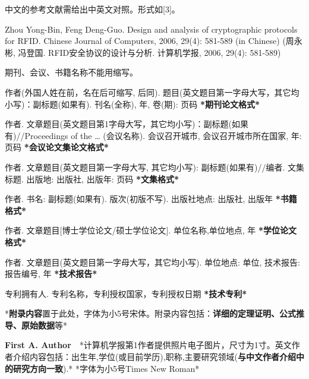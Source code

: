 \documentclass[10.5pt,compsoc]{CjC}
\theoremstyle{mystyle}
\begin{document}
\begin{CJK*}{UTF8}{song}
\begin{thebibliography}{99}
 中文的参考文献需给出中英文对照。形式如[3]。

 Zhou Yong-Bin, Feng Deng-Guo. Design and analysis of cryptographic
protocols for RFID. Chinese Journal of Computers, 2006, 29(4): 581-589 (in
Chinese) \newline
(周永彬, 冯登国. RFID安全协议的设计与分析. 计算机学报, 2006, 29(4): 581-589)

 期刊、会议、书籍名称不能用缩写。

 作者(外国人姓在前，名在后可缩写, 后同).
题目(英文题目第一字母大写，其它均小写)：副标题(如果有). 刊名(全称), 年,
卷(期): 页码 \textbf{*期刊论文格式*}

作者.
文章题目(英文题目第1字母大写，其它均小写)：副标题(如果有)//Proceedings of
the {\ldots} (会议名称). 会议召开城市, 会议召开城市所在国家, 年: 页码
\textbf{*会议论文集论文格式*}

作者. 文章题目(英文题目第一字母大写, 其它均小写):
副标题(如果有)//编者. 文集标题. 出版地: 出版社, 出版年: 页码
\textbf{*文集格式*}

作者. 书名: 副标题(如果有). 版次(初版不写). 出版社地点: 出版社,
出版年 \textbf{*书籍格式*}

作者. 文章题目[博士学位论文/硕士学位论文]. 单位名称,单位地点, 年
\textbf{*学位论文格式*}

作者. 文章题目(英文题目第一字母大写，其它均小写). 单位地点: 单位,
技术报告: 报告编号, 年 \textbf{*技术报告*}

专利拥有人. 专利名称，专利授权国家，专利授权日期
\textbf{*技术专利*}
  \end{thebibliography}

\begin{strip}
\end{strip}


{\setlength\parindent{2em}
*\textbf{附录内容}置于此处，字体为小5号宋体。附录内容包括：\textbf{详细的定理证明、公式推导、原始数据}等*}

\begin{strip}
\end{strip}

\begin{biography}
\noindent
\textbf{First A. Author}\ \ *计算机学报第1作者提供照片电子图片，尺寸为1寸。英文作者介绍内容包括：出生年,学位(或目前学历),职称,主要研究领域(\textbf{与中文作者介绍中的研究方向一致}).*
*字体为小5号Times New Roman*


\end{biography}
\end{CJK*}
\end{document}
